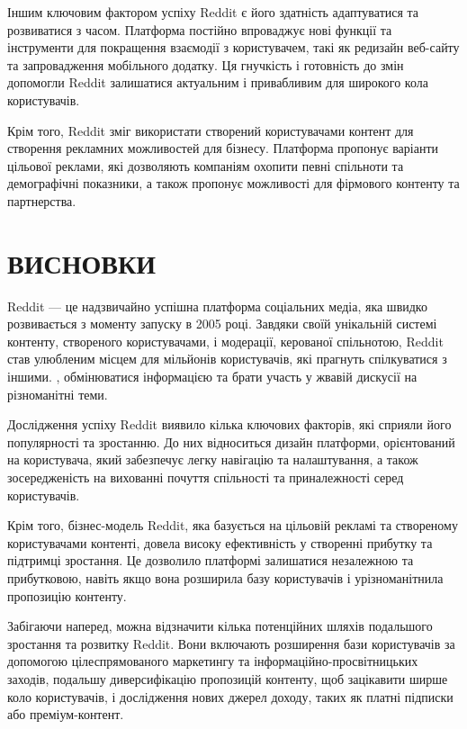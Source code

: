 \documentclass[oneside,14pt]{extarticle}
\begin{document}
Іншим ключовим фактором успіху Reddit є його здатність адаптуватися та розвиватися з часом. Платформа постійно впроваджує нові функції та інструменти для покращення взаємодії з користувачем, такі як редизайн веб-сайту та запровадження мобільного додатку. Ця гнучкість і готовність до змін допомогли Reddit залишатися актуальним і привабливим для широкого кола користувачів.

Крім того, Reddit зміг використати створений користувачами контент для створення рекламних можливостей для бізнесу. Платформа пропонує варіанти цільової реклами, які дозволяють компаніям охопити певні спільноти та демографічні показники, а також пропонує можливості для фірмового контенту та партнерства.

\section*{ВИСНОВКИ}

Reddit — це надзвичайно успішна платформа соціальних медіа, яка швидко розвивається з моменту запуску в 2005 році. Завдяки своїй унікальній системі контенту, створеного користувачами, і модерації, керованої спільнотою, Reddit став улюбленим місцем для мільйонів користувачів, які прагнуть спілкуватися з іншими. , обмінюватися інформацією та брати участь у жвавій дискусії на різноманітні теми.

Дослідження успіху Reddit виявило кілька ключових факторів, які сприяли його популярності та зростанню. До них відноситься дизайн платформи, орієнтований на користувача, який забезпечує легку навігацію та налаштування, а також зосередженість на вихованні почуття спільності та приналежності серед користувачів.

Крім того, бізнес-модель Reddit, яка базується на цільовій рекламі та створеному користувачами контенті, довела високу ефективність у створенні прибутку та підтримці зростання. Це дозволило платформі залишатися незалежною та прибутковою, навіть якщо вона розширила базу користувачів і урізноманітнила пропозицію контенту.

Забігаючи наперед, можна відзначити кілька потенційних шляхів подальшого зростання та розвитку Reddit. Вони включають розширення бази користувачів за допомогою цілеспрямованого маркетингу та інформаційно-просвітницьких заходів, подальшу диверсифікацію пропозицій контенту, щоб зацікавити ширше коло користувачів, і дослідження нових джерел доходу, таких як платні підписки або преміум-контент.
\end{document}

